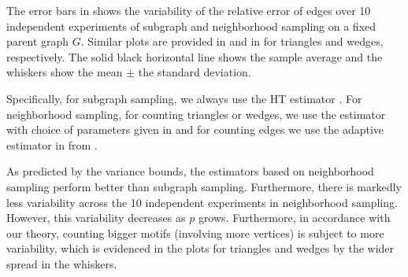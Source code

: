 The error bars in  shows the variability of the relative error of edges over 10 independent experiments of subgraph and neighborhood sampling on a fixed parent graph $ G $. Similar plots are provided in  and  in  for triangles and wedges, respectively. The solid black horizontal line shows the sample average and the whiskers show the mean $ \pm $ the standard deviation. 

Specifically, for subgraph sampling, we always use the HT estimator . For neighborhood sampling, for counting triangles or wedges, we use the estimator  with choice of parameters given in  and for counting edges we use the adaptive estimator in  from .

As predicted by the variance bounds, the estimators based on neighborhood sampling perform better than subgraph sampling. Furthermore, there is markedly less variability across the 10 independent experiments in neighborhood sampling. However, this variability decreases as $ p $ grows. Furthermore, in accordance with our theory, counting bigger motifs (involving more vertices) is subject to more variability, which is evidenced in the plots for triangles and wedges by the wider spread in the whiskers.


%

